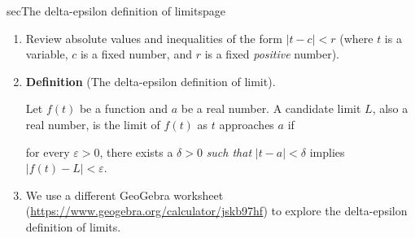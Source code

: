 \documentclass[../main.tex]{subfiles}
\begin{document}
\begin{outline}{sec}{The delta-epsilon definition of limits}{page}

  \begin{enumerate}
    \item Review absolute values and inequalities  of the form \(|t - c| < r\) (where \(t\) is a variable, \(c\) is a fixed number, and \(r\) is a fixed \emph{positive} number).
    \item \textbf{Definition} (The delta-epsilon definition of limit).
          \begin{mdframed}[style=simple]
            Let \(f(t)\) be a function and \(a\) be a real number. A candidate limit \(L\), also a real number, is the limit of \(f(t)\) as \(t\) approaches \(a\) if
            \begin{center}
              for every \(\varepsilon > 0\), there exists a \(\delta > 0\) \textit{such that} \(|t - a| < \delta\) implies \(|f(t) - L| < \varepsilon\).
            \end{center}
          \end{mdframed}

    \item[] We use a different GeoGebra worksheet (\url{https://www.geogebra.org/calculator/jskb97hf}) to explore the delta-epsilon definition of limits.


\end{enumerate}
\end{outline}
\end{document}

